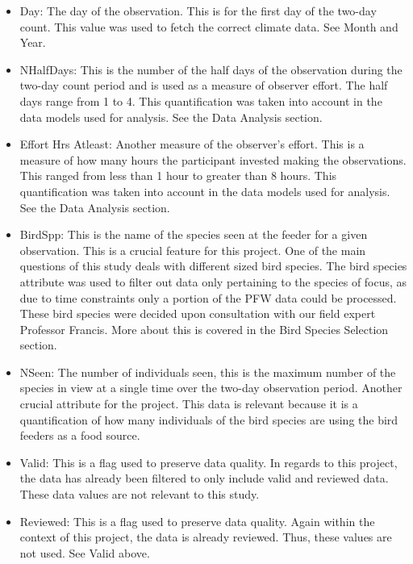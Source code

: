 \begin{itemize}
  \item Day: The day of the observation. This is for the first day of the two-day count. This value was used to fetch the correct climate data. See Month and Year.
  
  \item NHalfDays: This is the number of the half days of the observation during the two-day count period and is used as a measure of observer effort. The half days range from 1 to 4. This quantification was taken into account in the data models used for analysis. See the Data Analysis section.  
  
  \item Effort Hrs Atleast: Another measure of the observer's effort. This is a measure of how many hours the participant invested making the observations. This ranged from less than 1 hour to greater than 8 hours. This quantification was taken into account in the data models used for analysis. See the Data Analysis section.   
  
  \item BirdSpp: This is the name of the species seen at the feeder for a given observation. This is a crucial feature for this project. One of the main questions of this study deals with different sized bird species. The bird species attribute was used to filter out data only pertaining to the species of focus, as due to time constraints only a portion of the PFW data could be processed. These bird species were decided upon consultation with our field expert Professor Francis. More about this is covered in the Bird Species Selection section.
  
  \item NSeen: The number of individuals seen, this is the maximum number of the species in view at a single time over the two-day observation period. Another crucial attribute for the project. This data is relevant because it is a quantification of how many individuals of the bird species are using the bird feeders as a food source.
  
  \item Valid: This is a flag used to preserve data quality. In regards to this project, the data has already been filtered to only include valid and reviewed data. These data values are not relevant to this study.
  
  \item Reviewed: This is a flag used to preserve data quality. Again within the context of this project, the data is already reviewed. Thus, these values are not used. See Valid above.
  

\end{itemize}
